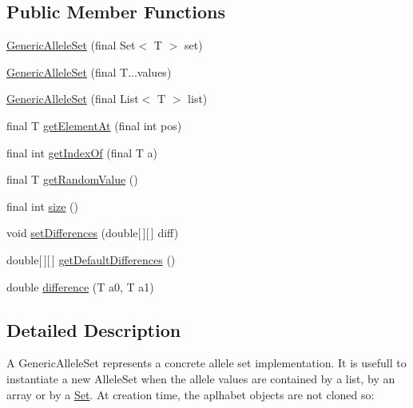 \subsection*{Public Member Functions}
\begin{CompactItemize}
\item 
\hyperlink{classjenes_1_1chromosome_1_1_generic_allele_set_3_01_t_01_4_fc6f6f35af245d54ba7ad6f57a9a3893}{GenericAlleleSet} (final Set$<$ T $>$ set)
\item 
\hyperlink{classjenes_1_1chromosome_1_1_generic_allele_set_3_01_t_01_4_e7a1970427bae039c3f4ae6340b53ca7}{GenericAlleleSet} (final T...values)
\item 
\hyperlink{classjenes_1_1chromosome_1_1_generic_allele_set_3_01_t_01_4_8cbf2394287ce6321fcd338dc4c44a8e}{GenericAlleleSet} (final List$<$ T $>$ list)
\item 
final T \hyperlink{classjenes_1_1chromosome_1_1_generic_allele_set_3_01_t_01_4_cf8f796e2243cc0b745b8d21e45ac7df}{getElementAt} (final int pos)
\item 
final int \hyperlink{classjenes_1_1chromosome_1_1_generic_allele_set_3_01_t_01_4_9b5dd0079f5d0cb76d2f89e92bde3fa6}{getIndexOf} (final T a)
\item 
final T \hyperlink{classjenes_1_1chromosome_1_1_generic_allele_set_3_01_t_01_4_2f330d71d992e0d724bc31730b56229e}{getRandomValue} ()
\item 
final int \hyperlink{classjenes_1_1chromosome_1_1_generic_allele_set_3_01_t_01_4_568ca617716496507d41e348c5bc2845}{size} ()
\item 
void \hyperlink{classjenes_1_1chromosome_1_1_generic_allele_set_3_01_t_01_4_234b0a286a14fcaf0bf10894813465c5}{setDifferences} (double\mbox{[}$\,$\mbox{]}\mbox{[}$\,$\mbox{]} diff)
\item 
double\mbox{[}$\,$\mbox{]}\mbox{[}$\,$\mbox{]} \hyperlink{classjenes_1_1chromosome_1_1_generic_allele_set_3_01_t_01_4_9c24972536c41a2d4660d9cad2694eba}{getDefaultDifferences} ()
\item 
double \hyperlink{classjenes_1_1chromosome_1_1_generic_allele_set_3_01_t_01_4_ce70b10ee535ccc3a7cbcd42739b8d5c}{difference} (T a0, T a1)
\end{CompactItemize}


\subsection{Detailed Description}
A GenericAlleleSet represents a concrete allele set implementation. It is usefull to instantiate a new AlleleSet when the allele values are contained by a list, by an array or by a \hyperlink{}{Set}. At creation time, the aplhabet objects are not cloned so: 

